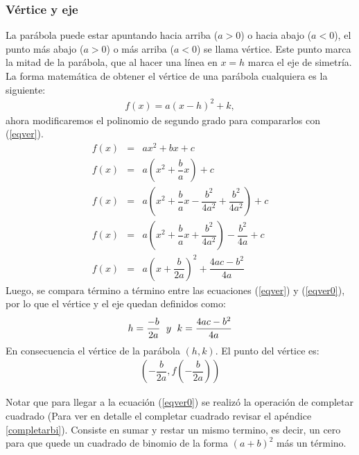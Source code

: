 \subsubsection{Vértice y eje}
La parábola puede estar apuntando hacia arriba ($a>0$) o hacia abajo ($a<0$), el punto más abajo ($a>0$) o más arriba ($a<0$) se llama vértice. Este punto marca la mitad de la parábola, que al hacer una línea en $x=h$ marca el eje de simetría. La forma matemática de obtener el vértice de una parábola cualquiera es la siguiente:\\
\begin{eqnarray}
f(x)=a(x-h)^{2}+k,\label{eqver}
\end{eqnarray}
ahora modificaremos el polinomio de segundo grado para compararlos con (\ref{eqver}).
\begin{eqnarray}
f(x)&=& ax^{2}+bx+c\nonumber\\
f(x)&=& a\left(x^{2}+\dfrac{b}{a}x \right)+c\nonumber\\
f(x)&=& a\left(x^{2}+\dfrac{b}{a}x-\dfrac{b^{2}}{4a^{2}}+\dfrac{b^{2}}{4a^{2}}  \right)+c\nonumber\\
f(x)&=& a\left(x^{2}+\dfrac{b}{a}x+\dfrac{b^{2}}{4a^{2}} \right)-\dfrac{b^{2}}{4a} +c\nonumber\\
f(x)&=& a\left(x+\dfrac{b}{2a} \right)^{2}+\dfrac{4ac-b^{2}}{4a} \label{eqver0}
\end{eqnarray}
Luego, se compara término a término entre las ecuaciones (\ref{eqver}) y (\ref{eqver0}), por lo que el vértice y el eje quedan definidos como:\\
\begin{eqnarray*}
h=\dfrac{-b}{2a}\hspace{6px}y\hspace{6px}k=\dfrac{4ac-b^{2}}{4a}
\end{eqnarray*}
En consecuencia el vértice de la parábola $(h,k)$. El punto del vértice es:
\begin{eqnarray}
\left(-\dfrac{b}{2a},f\left(-\dfrac{b}{2a} \right) \right)
\end{eqnarray}

Notar que para llegar a la ecuación (\ref{eqver0}) se realizó la operación de completar cuadrado (Para ver en detalle el completar cuadrado revisar el apéndice \ref{completarbi}). Consiste en sumar y restar un mismo termino, es decir, un cero para que quede un cuadrado de binomio de la forma $(a+b)^{2}$ más un término.  


